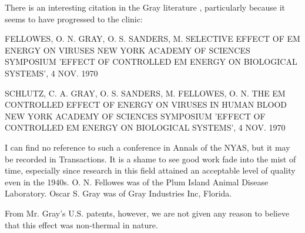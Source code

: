 \documentclass[paper.tex]{subfiles}
\begin{document}
There is an interesting citation in the Gray literature \cite{Indexa}, particularly because it seems to have progressed to the clinic:

FELLOWES, O. N. GRAY, O. S. SANDERS, M. SELECTIVE EFFECT OF EM ENERGY ON VIRUSES 
NEW YORK ACADEMY OF SCIENCES SYMPOSIUM 'EFFECT OF CONTROLLED EM ENERGY ON BIOLOGICAL SYSTEMS', 4 NOV. 1970

SCHLUTZ, C. A. GRAY, O. S. SANDERS, M. FELLOWES, O. N. 
THE EM CONTROLLED EFFECT OF ENERGY ON VIRUSES IN HUMAN BLOOD NEW YORK ACADEMY OF SCIENCES SYMPOSIUM 'EFFECT OF CONTROLLED EM ENERGY ON BIOLOGICAL SYSTEMS', 4 NOV. 1970

I can find no reference to such a conference in Annals of the NYAS, but it may be recorded in Transactions. It is a shame to see good work fade into the mist of time, especially since research in this field attained an acceptable level of quality even in the 1940s. O. N. Fellowes was of the Plum Island Animal Disease Laboratory. Oscar S. Gray was of Gray Industries Inc, Florida. 

From Mr. Gray's U.S. patents, however, we are not given any reason to believe that this effect was non-thermal in nature.
\end{document}
